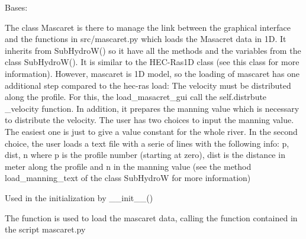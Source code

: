 \documentclass[letterpaper,10pt,english]{sphinxmanual}
\begin{document}

\begin{fulllineitems}
\label{\detokenize{index:src_GUI.hydro_GUI_2.Mascaret}}
Bases: {\hyperref[\detokenize{index:src_GUI.hydro_GUI_2.SubHydroW}]{}}

The class Mascaret is there to manage the link between the graphical interface and the functions in src/mascaret.py
which loads the Masacret data in 1D. It inherits from SubHydroW() so it have all the methods and the variables
from the class SubHydroW(). It is similar to the HEC-Ras1D class (see this class for more information). However, mascaret is 1D model, so the loading
of mascaret has one additional step compared to the hec-ras load: The velocity must be distributed along the
profile. For this, the load\_masacret\_gui call the self.distrbute \_velocity function. In addition, it prepares
the manning value which is necessary to distribute the velocity. The user has two choices to input the manning
value. The easiest one is just to give a value constant for the whole river. In the second choice, the user loads
a text file with a serie of lines with the following info: p, dist, n where p is the profile number
(starting at zero), dist is the distance in meter along the profile and n in the manning value (see the method
load\_manning\_text of the class SubHydroW for more information)

\begin{fulllineitems}
\label{\detokenize{index:src_GUI.hydro_GUI_2.Mascaret.init_iu}}
Used in the initialization by \_\_init\_\_()

\end{fulllineitems}


\begin{fulllineitems}
\label{\detokenize{index:src_GUI.hydro_GUI_2.Mascaret.load_mascaret_gui}}
The function is used to load the mascaret data, calling the function contained in the script mascaret.py

\end{fulllineitems}


\end{fulllineitems}
\end{document}
